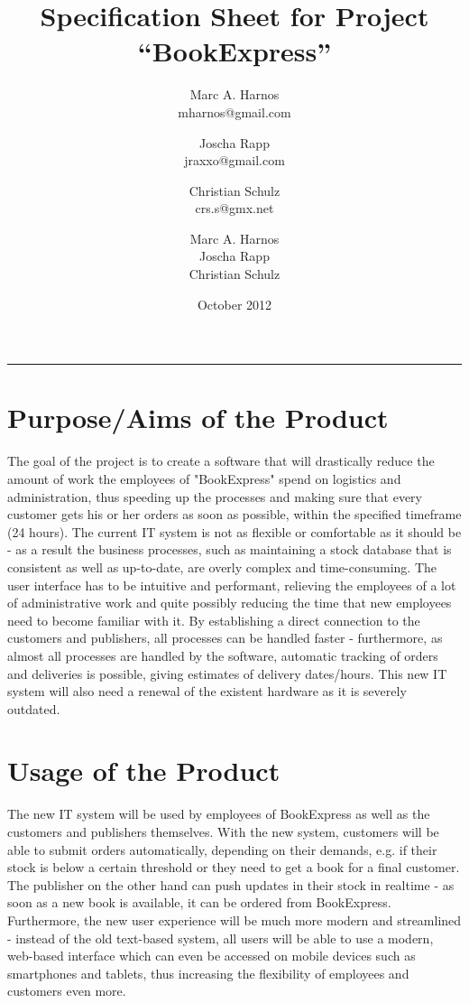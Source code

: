 \documentclass[11pt,a4paper,oneside,svgnames]{report}
\title{Specification Sheet for Project ``BookExpress''}
\author{Marc A. Harnos\\ {mharnos@gmail.com} \and Joscha Rapp\\ {jraxxo@gmail.com} \and Christian Schulz\\ {crs.s@gmx.net}}
\author{Marc A. Harnos\\ Joscha Rapp\\ Christian Schulz}
\date{October 2012}
\makeatletter
\renewcommand{\maketitle}{\begin{titlepage}%
    \let\footnotesize\small
    \let\footnoterule\relax
    \parindent \z@
    \reset@font
    \null\vfil
    \begin{flushleft}
      \huge \@title
    \end{flushleft}
    \par
    \hrule height 4pt
    \par
    \begin{flushright}
      \LARGE \@author \par
    \end{flushright}
    \vskip 60\p@
    \vfil\null
  \end{titlepage}%
  \setcounter{footnote}{0}%
}
\makeatother
\begin{document}
\maketitle
\clearpage
\tableofcontents
\clearpage

\section{Purpose/Aims of the Product}
The goal of the project is to create a software that will drastically reduce the amount of work the employees of "BookExpress" spend on logistics and administration, thus speeding up the processes and making sure that every customer gets his or her orders as soon as possible, within the specified timeframe (24 hours). The current IT system is not as flexible or comfortable as it should be - as a result the business processes, such as maintaining a stock database that is consistent as well as up-to-date, are overly complex and time-consuming. The user interface has to be intuitive and performant, relieving the employees of a lot of administrative work and quite possibly reducing the time that new employees need to become familiar with it. By establishing a direct connection to the customers and publishers, all processes can be handled faster - furthermore, as almost all processes are handled by the software, automatic tracking of orders and deliveries is possible, giving estimates of delivery dates/hours. This new IT system will also need a renewal of the existent hardware as it is severely outdated. 
\\
\section{Usage of the Product}
The new IT system will be used by employees of BookExpress as well as the customers and publishers themselves. With the new system, customers will be able to submit orders automatically, depending on their demands, e.g. if their stock is below a certain threshold or they need to get a book for a final customer. The publisher on the other hand can push updates in their stock in realtime - as soon as a new book is available, it can be ordered from BookExpress. Furthermore, the new user experience will be much more modern and streamlined - instead of the old text-based system, all users will be able to use a modern, web-based interface which can even be accessed on mobile devices such as smartphones and tablets, thus increasing the flexibility of employees and customers even more.
\\
\clearpage
\end{document}
